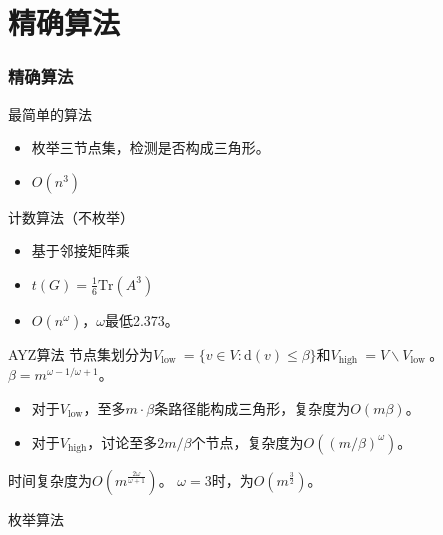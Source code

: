 \documentclass{beamer}
\begin{document}
\section{精确算法}
\begin{frame}
\frametitle{精确算法} 
最简单的算法
\begin{itemize}
    \item 枚举三节点集，检测是否构成三角形。
    \item $O(n^3)$
\end{itemize}
计数算法（不枚举）
\begin{itemize}
    \item 基于邻接矩阵乘
    \item $t(G)=\frac{1}{6}\text{Tr}(A^{3})$
    \item $O(n^{\omega})$，$\omega$最低2.373\cite{le2014powers}。
\end{itemize}
\begin{block}{AYZ算法\cite{alon1997finding}}
节点集划分为$V_{\text {low }}=\{v \in V: \mathrm{d}(v) \leq \beta\}$和$V_{\text {high }}=V \backslash V_{\text {low }}$。
$\beta=m^{\omega-1 / \omega+1}$。
\begin{itemize}
\item 对于$V_\text{low}$，至多$m \cdot \beta$条路径能构成三角形，复杂度为$O(m \beta)$。
\item 对于$V_\text{high}$，讨论至多$2m/ \beta$个节点，复杂度为$O((m/ \beta)^{\omega})$。
\end{itemize}
时间复杂度为$O( m^{\frac{2\omega}{\omega +1}})$。
$\omega = 3$时，为$O(m^{\frac{3}{2}})$。
\end{block}
枚举算法
\end{frame}
\end{document}
